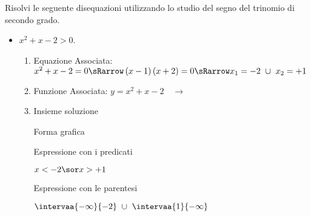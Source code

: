 \begin{esempio}
Risolvi le seguente disequazioni utilizzando lo studio del segno del trinomio 
di secondo grado.

\begin{itemize}
\item \(x^2+x-2>0\).

\begin{enumerate}
 \item
  Equazione Associata:~\(x^2+x-2=0 \sRarrow 
                        \left(x-1 \right)\left(x+2\right)=0 \sRarrow 
                        x_1=-2~\cup~x_2=+1\)
 \item 
  \begin{minipage}{.45\textwidth}
  Funzione Associata: \(y = x^2+x-2 \quad \rightarrow\)
  \end{minipage}
  \begin{minipage}{.30\textwidth}
  \end{minipage}
 \item 
 Insieme soluzione\\
 
  \begin{minipage}{.32\textwidth}
  Forma grafica\\[-.7em]
  
 \begin{center}
  \vspace{.4em}
 \end{center}
  \end{minipage}
  \begin{minipage}{.32\textwidth}
  Espressione con i predicati\\[-.3em]
  
 \begin{center}
  \(x<-2 \sor x>+1\)
  \vspace{1em}
 \end{center}
  \end{minipage}
  \begin{minipage}{.32\textwidth}
  Espressione con le parentesi\\[-.3em]
  
 \begin{center}
  \(\intervaa{-\infty}{-2}~\cup~\intervaa{1}{-\infty}\)
  \vspace{.8em}
 \end{center}
  \end{minipage}
\end{enumerate}


\end{itemize}
\end{esempio}
